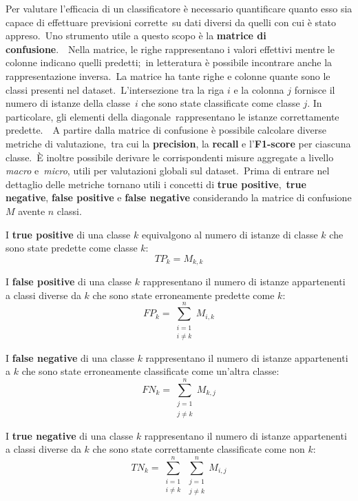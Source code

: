 Per valutare l'efficacia di un classificatore è necessario quantificare quanto esso sia capace di effettuare previsioni corrette\
su dati diversi da quelli con cui è stato appreso.\
Uno strumento utile a questo scopo è la \textbf{matrice di confusione}.\
\
Nella matrice, le righe rappresentano i valori effettivi mentre le colonne indicano quelli predetti;\
in letteratura è possibile incontrare anche la rappresentazione inversa.\
La matrice ha tante righe e colonne quante sono le classi presenti nel dataset.\
L'intersezione tra la riga $i$ e la colonna $j$ fornisce il numero di istanze della classe\
$i$ che sono state classificate come classe $j$. In particolare, gli elementi della diagonale\
rappresentano le istanze correttamente predette.\
\
A partire dalla matrice di confusione è possibile calcolare diverse metriche di valutazione,\
tra cui la \textbf{precision}, la \textbf{recall} e l'\textbf{F1-score} per ciascuna classe.\
È inoltre possibile derivare le corrispondenti misure aggregate a livello \textit{macro} e\
\textit{micro}, utili per valutazioni globali sul dataset.\
Prima di entrare nel dettaglio delle metriche tornano utili i concetti di \textbf{true positive},\
\textbf{true negative}, \textbf{false positive} e \textbf{false negative} considerando la matrice di confusione $M$ avente $n$ classi.

I \textbf{true positive} di una classe $k$ equivalgono al numero di istanze di classe $k$ che
sono state predette come classe $k$:
\[
      TP_{k} = M_{k,k}
\]

I \textbf{false positive} di una classe $k$ rappresentano il numero di istanze appartenenti a
classi diverse da $k$ che sono state erroneamente predette come $k$:
\[
      FP_{k} = \sum_{\substack{i=1 \\ i \neq k}}^{n} M_{i,k}
\]

I \textbf{false negative} di una classe $k$ rappresentano il numero di istanze appartenenti a
$k$ che sono state erroneamente classificate come un'altra classe:
\[
      FN_{k} = \sum_{\substack{j=1 \\ j \neq k}}^{n} M_{k,j}
\]

I \textbf{true negative} di una classe $k$ rappresentano il numero di istanze appartenenti a
classi diverse da $k$ che sono state correttamente classificate come non $k$:
\[
      TN_{k} = \sum_{\substack{i=1 \\ i \neq k}}^{n}
      \sum_{\substack{j=1 \\ j \neq k}}^{n} M_{i,j}
\]

